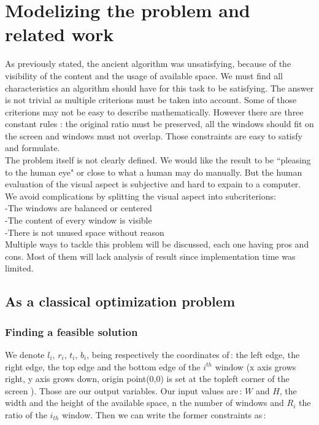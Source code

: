 \documentclass{acmtog}
\begin{document}
\section{Modelizing the problem and related work}

As previously stated, the ancient algorithm was unsatisfying, because of the visibility of the content and the usage of available space. We must find all characteristics  an algorithm should have for this task to be satisfying. The answer is not trivial as multiple criterions must be taken into account. Some of those criterions  may not be easy to describe mathematically. However there are three constant rules : the original ratio must be preserved, all the windows should fit on the screen and windows must not overlap. Those constraints are easy to satisfy and formulate.\\
The problem itself is not clearly defined. We would like the result to be ``pleasing to the human eye" or close to what a human may do manually. But the human evaluation of the visual aspect is subjective and hard to expain to a computer. We avoid complications by splitting the visual aspect into subcriterions:\\
-The windows are balanced or centered \\
-The content of every window is visible \\
-There is not unused space without reason \\
Multiple ways to tackle this problem will be discussed, each one having pros and cons. Most of them will lack analysis of result since implementation time was limited. 

\subsection{As a classical optimization problem}

\subsubsection{Finding a feasible solution}
We denote $l_i$, $r_i$, $t_i$, $b_i$, being respectively the coordinates of\,: the left edge, the right edge, the top edge and the bottom edge of the $i^{th}$ window (x axis grows right, y axis grows down, origin point(0,0) is set at the topleft corner of the screen ). Those are our output variables. Our input values are\,:  $W$ and $H$, the width and the height of the available space, n the number of windows and $R_i$ the ratio of the $i_{th}$ window. Then we can write the former constraints as\,:
\end{document}
